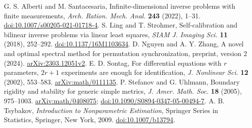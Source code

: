 G. S. Alberti and M. Santacesaria,
Infinite-dimensional inverse problems with finite measurements,
\emph{Arch. Ration. Mech. Anal.} \textbf{243} (2022), 1--31.
\href{https://doi.org/10.1007/s00205-021-01718-4}{doi:10.1007/s00205-021-01718-4}.
S. Ling and T. Strohmer,
Self-calibration and bilinear inverse problems via linear least squares,
\emph{SIAM J. Imaging Sci.} \textbf{11} (2018), 252--292.
\href{https://doi.org/10.1137/16M1103634}{doi:10.1137/16M1103634}.
D. Nguyen and A. Y. Zhang,
A novel and optimal spectral method for permutation synchronization,
preprint, version 2 (2024).
\href{https://arxiv.org/abs/2303.12051v2}{arXiv:2303.12051v2}.
E. D. Sontag,
For differential equations with $r$ parameters, $2r+1$ experiments are
enough for identification,
\emph{J. Nonlinear Sci.} \textbf{12} (2002), 553--583.
\href{https://arxiv.org/abs/math/0111135}{arXiv:math/0111135}.
P. Stefanov and G. Uhlmann,
Boundary rigidity and stability for generic simple metrics,
\emph{J. Amer. Math. Soc.} \textbf{18} (2005), 975--1003.
\href{https://arxiv.org/abs/math/0408075}{arXiv:math/0408075};
\href{https://doi.org/10.1090/S0894-0347-05-00494-7}{doi:10.1090/S0894-0347-05-00494-7}.
A. B. Tsybakov, \emph{Introduction to Nonparametric Estimation},
Springer Series in Statistics, Springer, New York, 2009.
\href{https://doi.org/10.1007/b13794}{doi:10.1007/b13794}.

